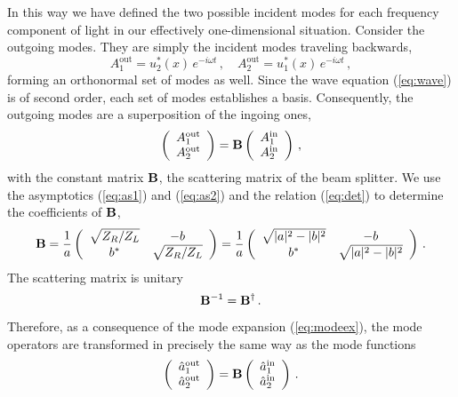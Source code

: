 \documentclass[12pt,amsmath,amssymb]{article}
\def\underline#1{{\bf #1}}
\numberwithin{equation}{section}
\begin{document}
In this way we have defined the two possible incident modes for
each frequency component of light in our effectively one-dimensional
situation. Consider the outgoing modes.
They are simply the incident modes traveling backwards,
\begin{equation}
A_1^\mathrm{out} = u_2^*(x)\,e^{-i\omega t} \,,\quad
A_2^\mathrm{out} = u_1^*(x)\,e^{-i\omega t} \,,
\end{equation}
forming an orthonormal set of modes as well.
Since the wave equation (\ref{eq:wave}) is of second order,
each set of modes establishes a basis.
Consequently, the outgoing modes are a superposition of the
ingoing ones,
\begin{equation}
\left(
    \begin{array}{c}
     A_1^\mathrm{out}  \\
     A_2^\mathrm{out}
    \end{array}
\right)
=
\underline{B}
\left(
    \begin{array}{c}
     A_1^\mathrm{in}  \\
     A_2^\mathrm{in}
    \end{array}
\right)\,,
\end{equation}
with the constant matrix $\underline{B}$, the scattering matrix
of the beam splitter.
We use the asymptotics (\ref{eq:as1}) and (\ref{eq:as2}) and the relation
(\ref{eq:det}) to determine the coefficients of  $\underline{B}$,
\begin{equation}
\label{eq:mediab} \underline{B} = \frac{1}{a} \left(
    \begin{array}{cc}
      \sqrt{Z_R/Z_L} & -b \\
      b^* & \sqrt{Z_R/Z_L}
    \end{array}
\right)
=
\frac{1}{a}
\left(
    \begin{array}{cc}
      \sqrt{|a|^2 - |b|^2} & -b \\
      b^* & \sqrt{|a|^2 - |b|^2}
    \end{array}
\right) \,.
\end{equation}
The scattering matrix is unitary
\begin{equation}
\label{eq:unib}
\underline{B}^{-1} =\underline{B}^\dagger \,.
\end{equation}
Therefore, as a consequence of the mode expansion (\ref{eq:modeex}),
the mode operators are transformed in precisely the same way as the
mode functions
\begin{equation}
\left(
    \begin{array}{c}
     \hat{a}_1^\mathrm{out}  \\
     \hat{a}_2^\mathrm{out}
    \end{array}
\right)
=
\underline{B}
\left(
    \begin{array}{c}
     \hat{a}_1^\mathrm{in}  \\
     \hat{a}_2^\mathrm{in}
    \end{array}
\right)\,.
\end{equation}
\end{document}
